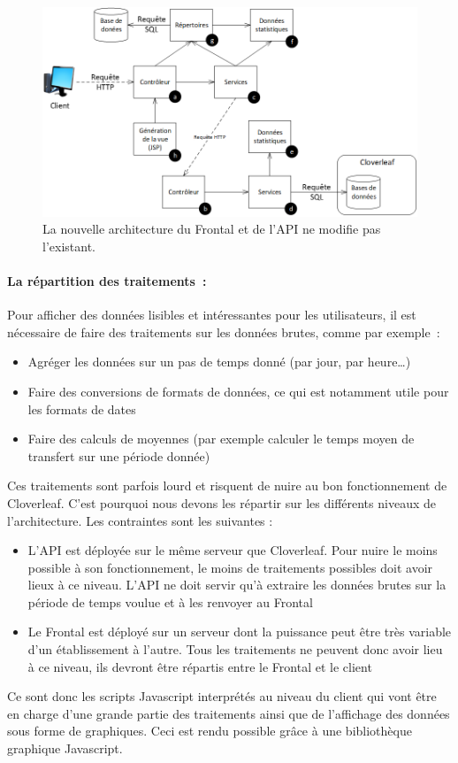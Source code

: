 			\begin{figure}[H]
				\centering
				\includegraphics[width=16cm]{../img/part3/archi_stats.png}
				\caption{\label{archi_stats} La nouvelle architecture du Frontal et de
				l'API ne modifie pas l'existant.}
			\end{figure}
			
			\paragraph{La répartition des traitements~:}
			Pour afficher des données lisibles et intéressantes pour les utilisateurs, il
			est nécessaire de faire des traitements sur les données brutes, comme par
			exemple~:
			\begin{itemize}
			  \item Agréger les données sur un pas de temps donné (par jour, par heure\ldots)
			  \item Faire des conversions de formats de données, ce qui est notamment
			  utile pour les formats de dates
			  \item Faire des calculs de moyennes (par exemple calculer le temps moyen de
			  transfert sur une période donnée)
			\end{itemize}
			Ces traitements sont parfois lourd et risquent de nuire au bon fonctionnement
			de Cloverleaf. C'est pourquoi nous devons les répartir sur les différents
			niveaux de l'architecture. Les contraintes sont les suivantes :
			\begin{itemize}
			  \item L'API est déployée sur le même serveur que Cloverleaf. Pour nuire le
			  moins possible à son fonctionnement, le moins de traitements possibles
			  doit avoir lieux à ce niveau. L'API ne doit servir qu'à extraire les
			  données brutes sur la période de temps voulue et à les renvoyer au Frontal
			  \item Le Frontal est déployé sur un serveur dont la puissance peut être
			  très variable d'un établissement à l'autre. Tous les traitements ne
			  peuvent donc avoir lieu à ce niveau, ils devront être répartis entre le
			  Frontal et le client
			\end{itemize}
			Ce sont donc les scripts Javascript interprétés au niveau du client qui vont
			être en charge d'une grande partie des traitements ainsi que de l'affichage
			des données sous forme de graphiques. Ceci est rendu possible grâce à une
			bibliothèque graphique Javascript.
			
